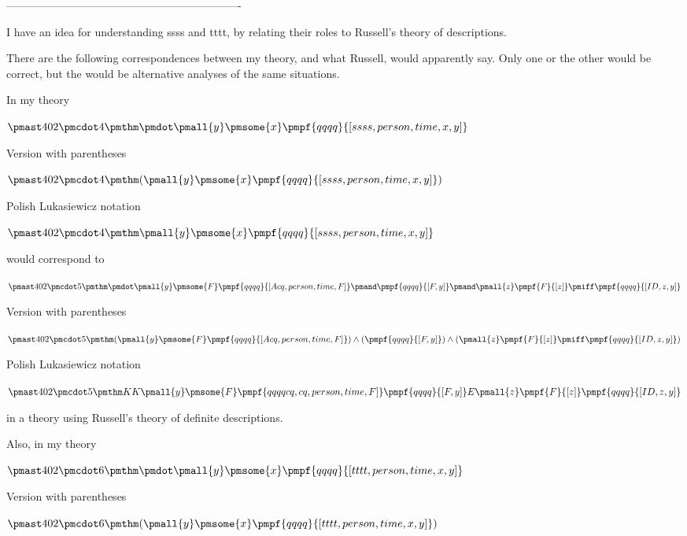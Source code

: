 \documentclass[12pt]{article}
\begin{document}
----------------------------------------------------------------

I have an idea for understanding ssss and tttt, by relating their roles to Russell's theory of descriptions.

There are the following correspondences between my theory, and what Russell,
would apparently say. Only one or the other would be correct, but the would
be alternative analyses of the same situations.

In my theory

$\pmast 402 \pmcdot 4 \pmthm \pmdot \pmall{y} \pmsome{x} \pmpf{qqqq}{[ssss, person, time, x, y]} $
 
 

Version with parentheses

$\pmast 402 \pmcdot 4 \pmthm  (  \pmall{y}\pmsome{x}\pmpf{qqqq}{[ssss, person, time, x, y]} )$


Polish Lukasiewicz notation

$\pmast 402 \pmcdot 4 \pmthm \pmall{y}\pmsome{x}\pmpf{qqqq}{[ssss,   person,   time,   x,   y]}  $


would correspond to 

$\pmast 402 \pmcdot 5 \pmthm \pmdot \pmall{y} \pmsome{F} \pmpf{qqqq}{[Acq, person,time,F]} \pmand \pmpf{qqqq}{[F, y]} \pmand \pmall{z} \pmpf{F}{[z]} \pmiff \pmpf{qqqq}{[ID,z,y]} $
 
 

Version with parentheses

$\pmast 402 \pmcdot 5 \pmthm  (  \pmall{y}\pmsome{F} \pmpf{qqqq}{[Acq, person,time,F]} ) \land ( \pmpf{qqqq}{[F, y]} ) \land ( \pmall{z}\pmpf{F}{[z]} \pmiff \pmpf{qqqq}{[ID,z,y]} )$


Polish Lukasiewicz notation

$\pmast 402 \pmcdot 5 \pmthm  K    K   \pmall{y}\pmsome{F}   \pmpf{qqqq  cq,   cq,   person,time,F]}   \pmpf{qqqq}{[F,   y]}    E   \pmall{z}\pmpf{F}{[z]}   \pmpf{qqqq}{[ID,z,y]}  $


in a theory using Russell's theory of definite descriptions.

Also, in my theory

$\pmast 402 \pmcdot 6 \pmthm \pmdot \pmall{y} \pmsome{x} \pmpf{qqqq}{[tttt, person, time, x, y]} $
 
 

Version with parentheses

$\pmast 402 \pmcdot 6 \pmthm  (  \pmall{y}\pmsome{x}\pmpf{qqqq}{[tttt, person, time, x, y]} )$
\end{document}
